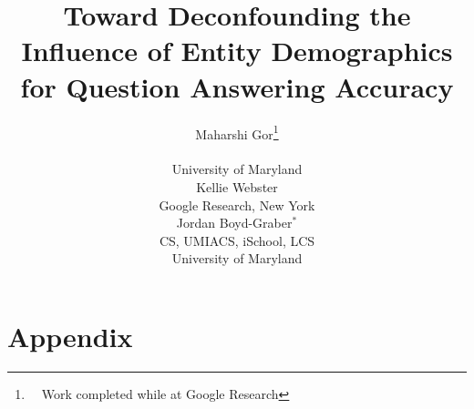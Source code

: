 \documentclass[11pt]{article}
\title{Toward Deconfounding the Influence of Entity Demographics for Question Answering Accuracy}
\author{Maharshi Gor\thanks{\, \, Work completed while at Google Research} \\ \abr{CS} \\ University of Maryland \\ \emaillink{mgor@cs.umd.edu}
 \And Kellie Webster \\ Google Research, New York \\ \emaillink{websterk@google.com}
 \And Jordan Boyd-Graber$^{*}$ \\ CS, UMIACS, iSchool, LCS \\ University of Maryland \\ \emaillink{jbg@umiacs.umd.edu}}
\newcommand{\latexfile}[1]{}
\begin{document}
\maketitle
\begin{abstract}
    \latexfile{00-abstract}
\end{abstract}

\latexfile{10-introduction}
\latexfile{20-entities}
\latexfile{fig-accuracy}
\latexfile{30-accuracy}
\latexfile{40-related}
\latexfile{60-conclusion}
\latexfile{80-acknowledgements}
\latexfile{70-ethics}







\clearpage
\appendix\section*{Appendix}

\latexfile{8a-country-collapse}
\latexfile{8b-profession-collapse}
\clearpage
\latexfile{9a-logistic-regression-full}
\latexfile{9b1-nq-multi-answers}
\latexfile{9b2-triviaqa-multi-answers}
\clearpage
\end{document}
